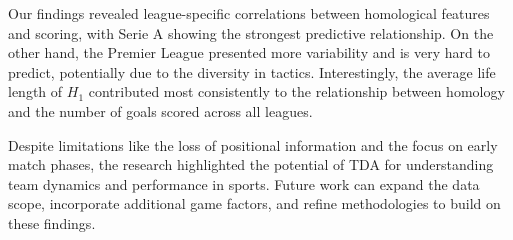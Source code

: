 \documentclass[10pt,twocolumn]{article}
\begin{document}
Our findings revealed league-specific correlations between homological features and scoring, with Serie A showing the strongest predictive relationship. On the other hand, the Premier League presented more variability and is very hard to predict, potentially due to the diversity in tactics. Interestingly, the average life length of $ H_1 $ contributed most consistently to the relationship between homology and the number of goals scored across all leagues.

Despite limitations like the loss of positional information and the focus on early match phases, the research highlighted the potential of TDA for understanding team dynamics and performance in sports. Future work can expand the data scope, incorporate additional game factors, and refine methodologies to build on these findings.
\newpage
\printbibliography

\begin{quote}
\end{quote}
\end{document}
